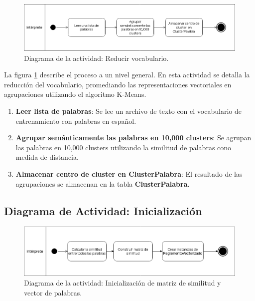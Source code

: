 \begin{figure}[ht]
    \centering
    \includegraphics[scale=0.5]{images/5/actividad-reducir-vocabulario}
    \caption{Diagrama de la actividad: Reducir vocabulario.}
    \label{fig:reducir-vocabulario}
\end{figure}

La figura \ref{fig:reducir-vocabulario} describe el proceso a un nivel general. En esta actividad se detalla la reducción del vocabulario, promediando las representaciones vectoriales en agrupaciones utilizando el algoritmo K-Means.

\begin{enumerate}
    \item \textbf{Leer lista de palabras}: Se lee un archivo de texto con el vocabulario de entrenamiento con palabras en español.
    \item \textbf{Agrupar semánticamente las palabras en 10,000 clusters}: Se agrupan las palabras en 10,000 clusters utilizando la similitud de palabras cono medida de distancia.
    \item \textbf{Almacenar centro de cluster en ClusterPalabra}: El resultado de las agrupaciones se almacenan en la tabla \textbf{ClusterPalabra}.
\end{enumerate}

\subsection{Diagrama de Actividad: Inicialización}

\begin{figure}[ht]
    \centering
    \includegraphics[scale=0.5]{images/5/actividad-inicializacion}
    \caption{Diagrama de la actividad: Inicialización de matriz de similitud y vector de palabras.}
    \label{fig:actividad-inicializacion}
\end{figure}

